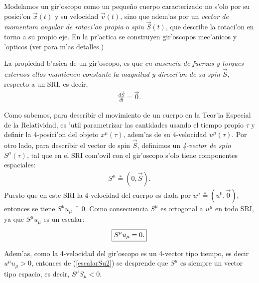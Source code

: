 Modelamos un gir'oscopo como un peque\~no cuerpo caracterizado no s'olo por %
su posici'on $\vec{x}(t)$ y su velocidad $\vec{v}(t)$, sino que adem'as por un \textit{vector de momentum angular de rotaci'on propia} o \textit{spin} $\vec{S}(t)$, que describe la rotaci'on en torno a su propio eje. En la pr'actica se construyen gir'oscopos mec'anicos y 'opticos (ver \cite{1} para m'as detalles.)

La propiedad b'asica de un gir'oscopo, es que \textit{en ausencia de fuerzas y torques externos ellos mantienen constante la magnitud y direcci'on de su spin $\vec{S}$}, respecto a un SRI, es decir, 
\begin{align}
\frac{d\vec{S}}{dt}=\vec{0}.\label{dinamicaS1}
\end{align}


Como sabemos, para describir el movimiento de un cuerpo en la Teor'ia Especial de la Relatividad, es 'util parametrizar las cantidades usando el tiempo propio $\tau$ y definir la 4-posici'on del objeto $x^\mu (\tau)$, adem'as de su 4-velocidad $u^\mu (\tau)$. Por otro lado, para describir el vector de spin $\vec{S}$, definimos un \textit{4-vector de spin} $S^\mu (\tau)$, tal que en el SRI com'ovil con el gir'oscopo s'olo tiene componentes espaciales:
\begin{align}
S^\mu \stackrel{*}{=}(0,\vec{S}).
\end{align}
Puesto que en este SRI la 4-velocidad del cuerpo es dada por $u^\mu\stackrel{*}{=}(u^0,\vec{0})$, entonces se tiene $S^\mu u_\mu\stackrel{*}{=}0$. Como consecuencia $S^{\mu}$ es ortogonal a $u^{\mu}$ en todo SRI, ya que $S^\mu u_\mu$ es un escalar:
\begin{equation}\boxed{\label{escalarSu2}
S^\mu u_\mu=0.}
\end{equation}

Adem'as, como la 4-velocidad del gir'oscopo es un 4-vector tipo tiempo, es decir $u^{\mu}u_{\mu}>0$, entonces de (\ref{escalarSu2}) se desprende que $S^{\mu}$ es siempre un vector tipo espacio, es decir, $S^\mu S_{\mu}<0$.

